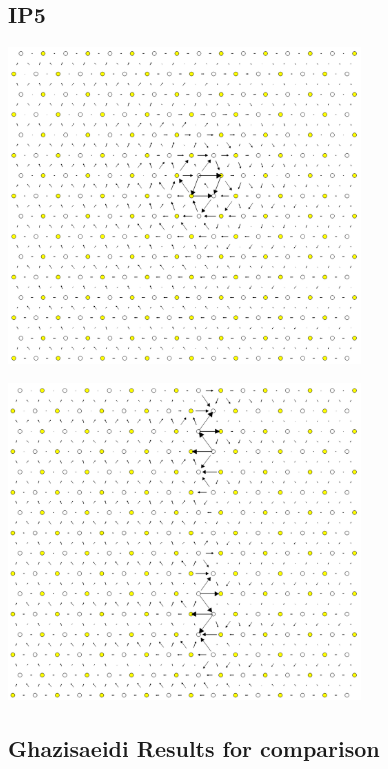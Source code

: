 \documentclass[11pt]{article}
\begin{document}
\subsection{IP5}
\label{sec:org1839f07}
\begin{center}
\includegraphics[width=0.7\textwidth]{Images/final_model_IP5_partial_dd_initial.png}
\end{center}
\begin{center}
\includegraphics[width=0.7\textwidth]{Images/final_model_IP5_partial_dd_final.png}
\end{center}

\subsection{Ghazisaeidi Results for comparison}
\label{sec:org973a71d}
\end{document}
